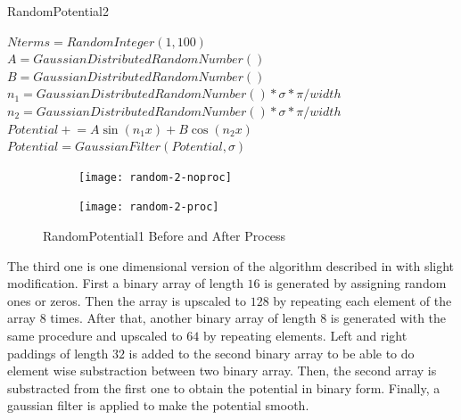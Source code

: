 \documentclass[a4paper,times,12pt]{article}
\begin{document}
\begin{algorithm}[H]
    \caption{RandomPotential2}\label{euclid}
    \begin{algorithmic}[1]
        \State $ Nterms = RandomInteger(1, 100)$
        \State $A = GaussianDistributedRandomNumber()$
        \State $B = GaussianDistributedRandomNumber()$
        \State $n_1 = GaussianDistributedRandomNumber() * \sigma*\pi / width  $
        \State $n_2 = GaussianDistributedRandomNumber() * \sigma*\pi / width  $
        \State $Potential \mathrel{+}= A\sin(n_1 x) + B\cos(n_2 x)$
        \EndFor
        \State $Potential = GaussianFilter(Potential, \sigma)$ 
    \EndProcedure
    \end{algorithmic}
\label{alg:random_potential_1}
\end{algorithm}

\graphicspath{{"../figs/potentials/"}}
\begin{figure}[H]
    \centering
    \begin{subfigure}[t]{0.45\textwidth}
        \texttt{[image: random-2-noproc]}
		
    \end{subfigure}
    \begin{subfigure}[t]{0.45\textwidth}
        \texttt{[image: random-2-proc]}
		
    \end{subfigure}
\caption{RandomPotential1 Before and After Process}
\label{fig:random2_before_after}
\end{figure}

The third one is one dimensional version of the algorithm described in \cite{mills2017deep} with slight modification. First a binary array of length $16$ is generated by assigning random ones or zeros. Then the array is upscaled to $128$ by repeating each element of the array $8$ times. After that, another binary array of length $8$ is generated with the same procedure and upscaled to $64$ by repeating elements. Left and right paddings of length $32$ is added to the second binary array to be able to do element wise substraction between two binary array. Then, the second array is substracted from the first one to obtain the potential in binary form. Finally, a gaussian filter is applied to make the potential smooth. 
\end{document}
